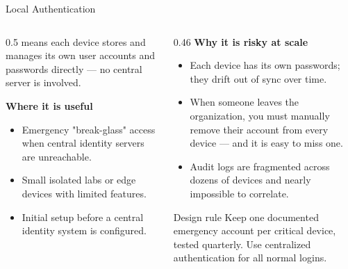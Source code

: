 \documentclass[aspectratio=169]{beamer}  %
\begin{document}
\begin{frame}{Local Authentication}
    \begin{columns}[T]
        \begin{column}{0.5\textwidth}
            \footnotesize
             means each device stores and manages its own user accounts and passwords directly --- no central server is involved.
            \vspace{0.4em}

            \textbf{Where it is useful}
            \begin{itemize}
                \item Emergency "break-glass" access when central identity servers are unreachable.
                \item Small isolated labs or edge devices with limited features.
                \item Initial setup before a central identity system is configured.
            \end{itemize}
        \end{column}
        \begin{column}{0.46\textwidth}
            \footnotesize
            \textbf{Why it is risky at scale}
            \begin{itemize}
                \item Each device has its own passwords; they drift out of sync over time.
                \item When someone leaves the organization, you must manually remove their account from every device --- and it is easy to miss one.
                \item Audit logs are fragmented across dozens of devices and nearly impossible to correlate.
            \end{itemize}

            \begin{alertblock}{Design rule}
                \footnotesize
                Keep one documented emergency account per critical device, tested quarterly. Use centralized authentication for all normal logins.
            \end{alertblock}
        \end{column}
    \end{columns}
\end{frame}
\end{document}
